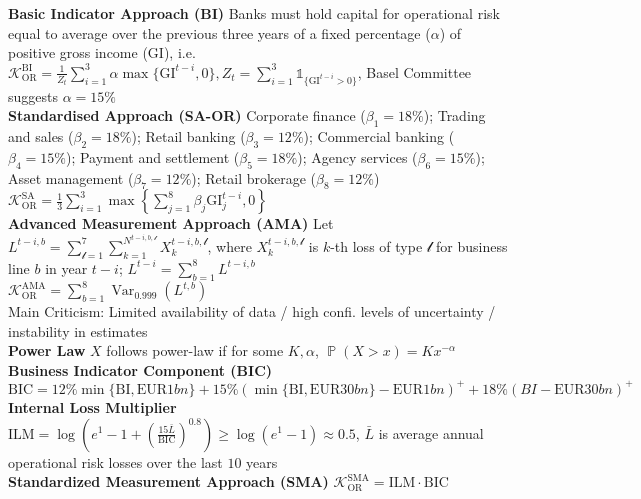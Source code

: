 \documentclass[12pt,landscape, a4paper]{article}
\theoremstyle{remark}
\newcommand{\var}{\operatorname{Var}}
\newcommand{\prob}{\operatorname{\mathbb{P}}}
\begin{document}
\begin{multicols*}{3}
\textbf{Basic Indicator Approach (BI)} Banks must hold capital for operational risk equal to average over the previous three years of a fixed percentage ($\alpha$) of positive gross income (GI), i.e. $\mathcal{K}^{\mathrm{BI}}_{\mathrm{OR}} =\frac{1}{Z_t} \sum^3_{i=1} \alpha \max \{\mathrm{GI}^{t-i}, 0 \}, Z_t = \sum^3_{i=1} \mathds{1}_{\{ \mathrm{GI}^{t-i} >0  \}} $, Basel Committee suggests $\alpha = 15\%$\\

\textbf{Standardised Approach (SA-OR)} Corporate finance ($\beta_1 = 18\%$); Trading and sales ($\beta_2 = 18\%$); Retail banking ($\beta_3 = 12\%$); Commercial banking ($\beta_4 = 15\%$); Payment and settlement ($\beta_5 = 18\%$); Agency services ($\beta_6 = 15\%$); Asset management ($\beta_7 = 12\%$); Retail brokerage ($\beta_8 = 12\%$)\\
$\mathcal{K}^{\mathrm{SA}}_{\mathrm{OR}} =\frac{1}{3} \sum^3_{i=1} \max \left\{ \sum^8_{j=1}  \beta_j \mathrm{GI}^{t-i}_{j}, 0 \right\} $\\

\textbf{Advanced Measurement Approach (AMA)} Let $L^{t-i, b} = \sum^7_{\mathscr{l}=1} \sum^{N^{t-i, b, \mathscr{l} } }_{k=1} X^{t-i, b, \mathscr{l}}_{k} $, where $X^{t-i, b, \mathscr{l}}_{k}$ is $k$-th loss of type $\mathscr{l}$ for business line $b$ in year $t-i$; $L^{t-i} =\sum^8_{b=1} L^{t-i, b} $\\
$\mathcal{K}^{\mathrm{AMA}}_{\mathrm{OR}} = \sum^8_{b=1} \var_{0.999} (L^{t, b}) $\\
Main Criticism: Limited availability of data / high confi. levels of uncertainty / instability in estimates\\

\textbf{Power Law} $X$ follows power-law if for some $K, \alpha$, $\prob (X>x) = K x^{-\alpha}$\\

\textbf{Business Indicator Component (BIC)} $\mathrm{BIC} = 12\% \min \{\mathrm{BI}, \mathrm{EUR} 1bn \} + 15\% (\min \{\mathrm{BI}, \mathrm{EUR} 30bn \} - \mathrm{EUR} 1bn)^+ + 18\% (BI - \mathrm{EUR} 30bn)^+$\\
\textbf{Internal Loss Multiplier} $\mathrm{ILM} = \log \left(e^1 - 1 + \left(\frac{15 \bar{L}}{\mathrm{BIC}} \right)^{0.8} \right) \geq \log (e^1-1)\approx 0.5 $, $\bar{L}$ is average annual operational risk losses over the last $10$ years\\
\textbf{Standardized Measurement Approach (SMA)} $\mathcal{K}^{\mathrm{SMA}}_{\mathrm{OR}} = \mathrm{ILM} \cdot \mathrm{BIC}$\\


\end{multicols*}
\end{document}
